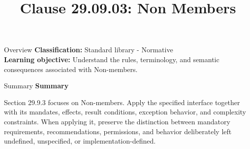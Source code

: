 \documentclass[10pt,letterpaper]{article}
\title{Clause 29.09.03: Non Members}
\author{}
\date{}
\begin{document}
\maketitle
\begin{CornellOverviewBox}{Overview}
\textbf{Classification:} Standard library - Normative\\[2pt]
\textbf{Learning objective:} Understand the rules, terminology, and semantic consequences associated with Non-members.
\end{CornellOverviewBox}\begin{CornellSummaryBox}{Summary}
{\sffamily\bfseries\color{Accent} Summary}\par\vspace{3pt}Section 29.9.3 focuses on Non-members. Apply the specified interface together with its mandates, effects, result conditions, exception behavior, and complexity constraints. When applying it, preserve the distinction between mandatory requirements, recommendations, permissions, and behavior deliberately left undefined, unspecified, or implementation-defined.
\end{CornellSummaryBox}
\end{document}
